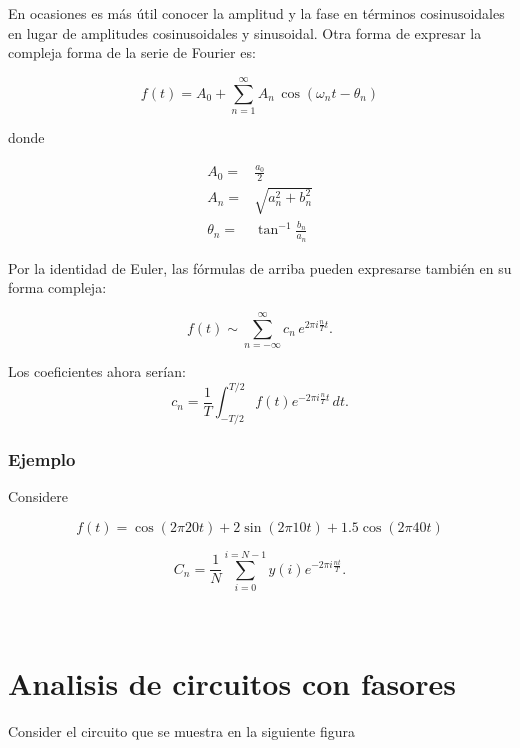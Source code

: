 \documentclass{article}
\begin{document}
En ocasiones es más útil conocer la amplitud y la fase en términos
cosinusoidales en lugar de amplitudes cosinusoidales y sinusoidal. Otra
forma de expresar la compleja forma de la serie de Fourier es:

\begin{equation}
f(t)=A_0+\sum_{n=1}^{\infty} A_{n}\,\cos({{\omega_n}t}-\theta_n)
\end{equation}

donde

\begin{align*}
A_0=&\frac{a_0}{2} \\
A_n=&\sqrt{a^2_n+b^2_n} \\
\theta_n=&\tan^{-1}\frac{b_n}{a_n}
\end{align*}

Por la identidad de Euler, las fórmulas de arriba pueden expresarse
también en su forma compleja:

\begin{equation}
f(t) \sim \sum_{n=-\infty}^{\infty} c_{n}\,e^{2\pi i\frac{n}{T}t}.
\end{equation}

Los coeficientes ahora serían: \[
c_n=\frac{1}{T}\int_{-T/2}^{T/2} f(t)e^{-2\pi i\frac {n}{T}t}\,dt.
\]


    \subsubsection{Ejemplo}


    Considere

\[
f(t)=\cos(2\pi20t)+2\sin(2\pi10t)+1.5\cos(2\pi40t)
\]

\[
C_{n}=\frac{1}{N}\sum_{i=0}^{i=N-1}y(i)e^{-2\pi i\frac {nt}{T}}.
\]


    \begin{center}
    \end{center}
    { \hspace*{\fill} \\}
    

    \section{Analisis de circuitos con fasores}


    Consider el circuito que se muestra en la siguiente figura
\end{document}
